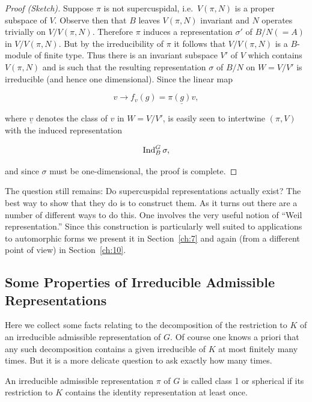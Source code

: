\begin{proof}[Proof (Sketch)]

Suppose $\pi$ is not supercuspidal, i.e.\ $V(\pi, N)$ is a proper subspace of $V$. Observe then that $B$ leaves $V(\pi, N)$ invariant and $N$ operates trivially on $V/V(\pi, N)$. Therefore $\pi$ induces a representation $\sigma'$ of $B/N (=A)$ in $V/V(\pi, N)$. But by the irreducibility of $\pi$ it follows that $V/V(\pi, N)$ is a $B$-module of finite type. Thus there is an invariant subspace $V'$ of $V$ which contains $V(\pi, N)$ and is such that the resulting representation $\sigma$ of $B/N$ on $W = V/V'$ is irreducible (and hence one dimensional). Since the linear map

\[
v \to f_v(g) = \underline{\pi(g)v},
\]

where $\underline{v}$ denotes the class of $v$ in $W = V/V'$, is easily seen to intertwine $(\pi, V)$ with the induced representation

\[
\operatorname{Ind}_B^G \sigma,
\]

and since $\sigma$ must be one-dimensional, the proof is complete.

\end{proof}

The question still remains: Do supercuspidal representations actually exist? The best way to show that they do is to construct them. As it turns out there are a number of different ways to do this. One involves the very useful notion of ``Weil representation.'' Since this construction is particularly well suited to applications to automorphic forms we present it in Section~\ref{ch:7} and again (from a different point of view) in Section~\ref{ch:10}.

\subsection{Some Properties of Irreducible Admissible Representations}

Here we collect some facts relating to the decomposition of the restriction to $K$ of an irreducible admissible representation of $G$. Of course one knows a priori that any such decomposition contains a given irreducible of $K$ at most finitely many times. But it is a more delicate question to ask exactly how many times.

\begin{definition}\label{def:4.22}

An irreducible admissible representation $\pi$ of $G$ is called class 1 or spherical if its restriction to $K$ contains the identity representation at least once.

\end{definition}

